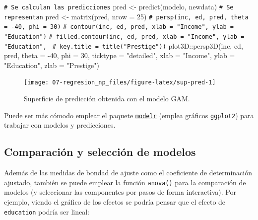 \documentclass[
]{book}
\newenvironment{Shaded}{\begin{snugshade}}{\end{snugshade}}
\newcommand{\AttributeTok}[1]{\textcolor[rgb]{0.77,0.63,0.00}{#1}}
\newcommand{\CommentTok}[1]{\textcolor[rgb]{0.56,0.35,0.01}{\textit{#1}}}
\newcommand{\DecValTok}[1]{\textcolor[rgb]{0.00,0.00,0.81}{#1}}
\newcommand{\FunctionTok}[1]{\textcolor[rgb]{0.00,0.00,0.00}{#1}}
\newcommand{\NormalTok}[1]{#1}
\newcommand{\OtherTok}[1]{\textcolor[rgb]{0.56,0.35,0.01}{#1}}
\newcommand{\SpecialCharTok}[1]{\textcolor[rgb]{0.00,0.00,0.00}{#1}}
\newcommand{\StringTok}[1]{\textcolor[rgb]{0.31,0.60,0.02}{#1}}
\theoremstyle{break}
\theoremstyle{nonumberplain}
\renewcommand{\CommentTok}[1]{\textcolor[rgb]{0.41,0.41,0.41}{\texttt{#1}}}
\begin{document}
\begin{Shaded}
\begin{Highlighting}[]
\CommentTok{\# Se calculan las predicciones}
\NormalTok{pred }\OtherTok{\textless{}{-}} \FunctionTok{predict}\NormalTok{(modelo, newdata)}
\CommentTok{\# Se representan}
\NormalTok{pred }\OtherTok{\textless{}{-}} \FunctionTok{matrix}\NormalTok{(pred, }\AttributeTok{nrow =} \DecValTok{25}\NormalTok{)}
\CommentTok{\# persp(inc, ed, pred, theta = {-}40, phi = 30)}
\CommentTok{\# contour(inc, ed, pred, xlab = "Income", ylab = "Education")}
\CommentTok{\# filled.contour(inc, ed, pred, xlab = "Income", ylab = "Education", }
\CommentTok{\#                key.title = title("Prestige"))}
\NormalTok{plot3D}\SpecialCharTok{::}\FunctionTok{persp3D}\NormalTok{(inc, ed, pred, }\AttributeTok{theta =} \SpecialCharTok{{-}}\DecValTok{40}\NormalTok{, }\AttributeTok{phi =} \DecValTok{30}\NormalTok{, }\AttributeTok{ticktype =} \StringTok{"detailed"}\NormalTok{,}
                \AttributeTok{xlab =} \StringTok{"Income"}\NormalTok{, }\AttributeTok{ylab =} \StringTok{"Education"}\NormalTok{, }\AttributeTok{zlab =} \StringTok{"Prestige"}\NormalTok{)}
\end{Highlighting}
\end{Shaded}

\begin{figure}[!htb]

{\centering \texttt{[image: 07-regresion\_np\_files/figure-latex/sup-pred-1]} 

}

\caption{Superficie de predicción obtenida con el modelo GAM.}\label{fig:sup-pred}
\end{figure}

Puede ser más cómodo emplear el paquete \href{https://modelr.tidyverse.org}{\texttt{modelr}} (emplea gráficos \texttt{ggplot2}) para trabajar con modelos y predicciones.

\hypertarget{comparaciuxf3n-y-selecciuxf3n-de-modelos}{%
\subsection{Comparación y selección de modelos}\label{comparaciuxf3n-y-selecciuxf3n-de-modelos}}

Además de las medidas de bondad de ajuste como el coeficiente de determinación ajustado, también se puede emplear la función \texttt{anova()} para la comparación de modelos (y seleccionar las componentes por pasos de forma interactiva).
Por ejemplo, viendo el gráfico de los efectos se podría pensar que el efecto de \texttt{education} podría ser lineal:
\end{document}
